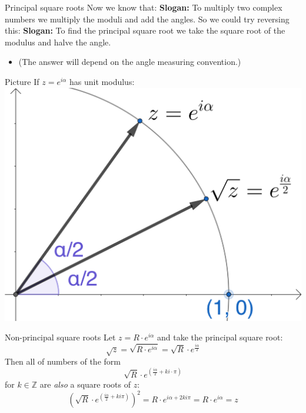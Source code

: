 \documentclass{beamer}
\begin{document}
\begin{frame}{Principal square roots}
Now we know that:\vfill
{\bf Slogan:} To multiply two complex numbers we multiply the moduli and add the angles.\vfill
So we could try reversing this:\vfill
{\bf Slogan:} To find the principal square root we take the square root of the modulus and halve the angle.\vfill
\begin{itemize}
	\item (The answer will depend on the angle measuring convention.)
\end{itemize}
\end{frame}

\begin{frame}{Picture}
If $z = e^{i\alpha}$ has unit modulus:\vfill
\includegraphics[scale=5]{principal-square-root.png}
\end{frame}

\begin{frame}{Non-principal square roots}
Let $z = R\cdot e^{i\alpha}$ and take the principal square root:\vfill
{\LARGE
\begin{equation*}
\sqrt{z} = \sqrt{R\cdot e^{i\alpha}} = \sqrt{R}\cdot e^{\frac{i\alpha}{2}}
\end{equation*}
}\vfill
Then all of numbers of the form\vfill
{\LARGE
\begin{equation*}
\sqrt{R}\cdot e^{(\frac{i\alpha}{2}+ki\cdot\pi)}
\end{equation*}
}\vfill
for $k\in \mathbb{Z}$ are \emph{also} a square roots of $z$:\vfill
{\LARGE
\begin{equation*}
\left(\sqrt{R}\cdot e^{(\frac{i\alpha}{2}+ki\pi)}\right)^2 = R\cdot e^{i\alpha + 2ki\pi} = R\cdot e^{i\alpha} = z
\end{equation*}
}
\end{frame}
\end{document}

